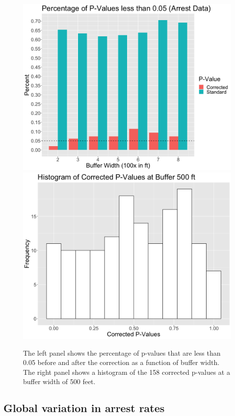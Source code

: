 \documentclass[a4paper,11pt]{article}
\begin{document}
\begin{figure}[h]
    \centering
        \includegraphics[width=0.45\linewidth]{plots/NewMatchesRejections.png}
    \includegraphics[width=0.45\linewidth]{plots/HistAdjPVal500.png}
        \caption{The left panel shows the percentage of p-values that are less than 0.05 before and after the correction as a function of buffer width. The right panel shows a histogram of the 158 corrected p-values at a buffer width of 500 feet.}
    \label{fig:adjustedPval}
\end{figure}

\subsection{Global variation in arrest rates}
\label{sec:GlobalNYC}
\end{document}
